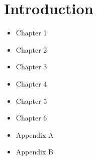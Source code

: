 \chapter{Introduction}
\label{intro_chapter}

\begin{itemize}

\item Chapter 1

\item Chapter 2

\item Chapter 3

\item Chapter 4

\item Chapter 5

\item Chapter 6

\item Appendix A

\item Appendix B

\end{itemize}



